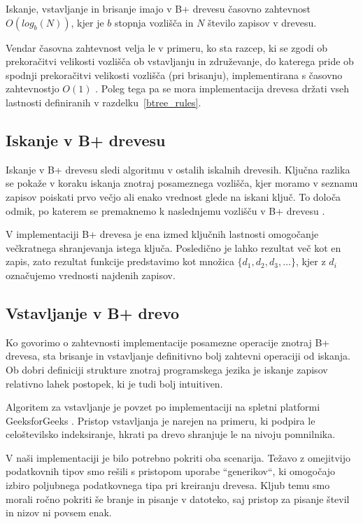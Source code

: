 \documentclass[a4paper,12pt,openright]{book}
\begin{document}
        Iskanje, vstavljanje in brisanje imajo v B+ drevesu časovno zahtevnost \newline $O(log_b(N))$, kjer je $b$ stopnja vozlišča in $N$ število zapisov v drevesu.

        Vendar časovna zahtevnost velja le v primeru, ko sta razcep, ki se zgodi ob prekoračitvi velikosti vozlišča ob vstavljanju in združevanje, do katerega pride ob spodnji prekoračitvi velikosti vozlišča (pri brisanju), implementirana s časovno zahtevnostjo $O(1)$ \cite{goodrich2011data}. Poleg tega pa se mora implementacija drevesa držati vseh lastnosti definiranih v razdelku~\ref{btree_rules}.

        \subsection{Iskanje v B+ drevesu}

        Iskanje v B+ drevesu sledi algoritmu v ostalih iskalnih drevesih. Ključna razlika se pokaže v koraku iskanja znotraj posameznega vozlišča, kjer moramo v seznamu zapisov poiskati prvo večjo ali enako vrednost glede na iskani ključ. To določa odmik, po katerem se premaknemo k naslednjemu vozlišču v B+ drevesu \cite{goodrich2011data}.

        V implementaciji B+ drevesa je ena izmed ključnih lastnosti omogočanje večkratnega shranjevanja istega ključa. Posledično je lahko rezultat več kot en zapis, zato rezultat funkcije predstavimo kot množica $\{d_1, d_2, d_3, \ldots\}$, kjer z $d_i$ označujemo vrednosti najdenih zapisov.

        \subsection{Vstavljanje v B+ drevo}

        Ko govorimo o zahtevnosti implementacije posamezne operacije znotraj B+ drevesa, sta brisanje in vstavljanje definitivno bolj zahtevni operaciji od iskanja. Ob dobri definiciji strukture znotraj programskega jezika je iskanje zapisov relativno lahek postopek, ki je tudi bolj intuitiven.

        Algoritem za vstavljanje je povzet po implementaciji na spletni platformi GeeksforGeeks \cite{G4G_BINSERT}. Pristop vstavljanja je narejen na primeru, ki podpira le celoštevilsko indeksiranje, hkrati pa drevo shranjuje le na nivoju pomnilnika.
        
        V naši implementaciji je bilo potrebno pokriti oba scenarija. Težavo z omejitvijo podatkovnih tipov smo rešili s pristopom uporabe ``generikov``, ki omogočajo izbiro poljubnega podatkovnega tipa pri kreiranju drevesa. Kljub temu smo morali ročno pokriti še branje in pisanje v datoteko, saj pristop za pisanje števil in nizov ni povsem enak.
\end{document}
